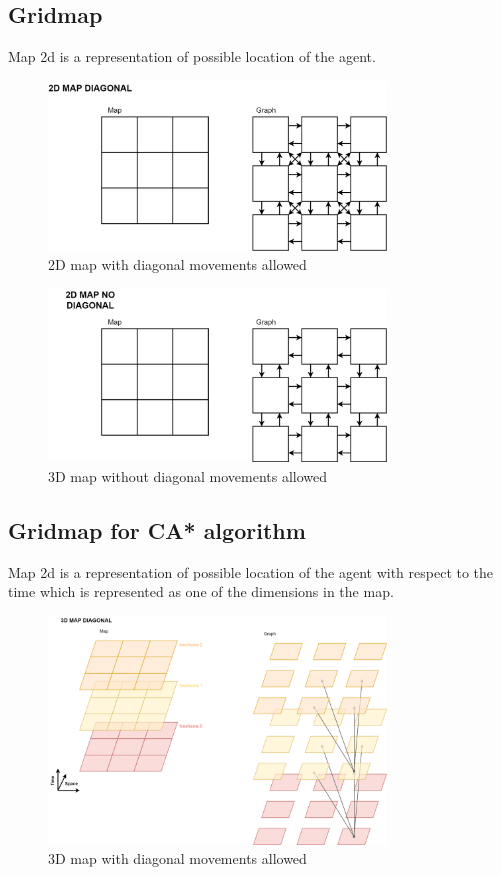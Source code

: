 \subsection{Gridmap}
Map 2d is a representation of possible location of the agent.
\begin{figure}[H]
    \centering
    \includegraphics[width=0.8\textwidth]{pictures/map_2D_diag.png}
    \caption{ 2D map with diagonal movements allowed }
    \label{fig:map_2D_diag}
\end{figure}

\begin{figure}[H]
    \centering
    \includegraphics[width=0.8\textwidth]{pictures/map_2D_no_diag.png}
    \caption{ 3D map without diagonal movements allowed }
    \label{fig:map_2D_no_diag}
\end{figure}

\subsection{Gridmap for CA* algorithm}
Map 2d is a representation of possible location of the agent with respect to the time which is represented as one of the dimensions in the map.
\begin{figure}[H]
    \centering
    \includegraphics[width=0.8\textwidth]{pictures/map_3D_diag.png}
    \caption{ 3D map with diagonal movements allowed }
    \label{fig:map_3D_diag}
\end{figure}

